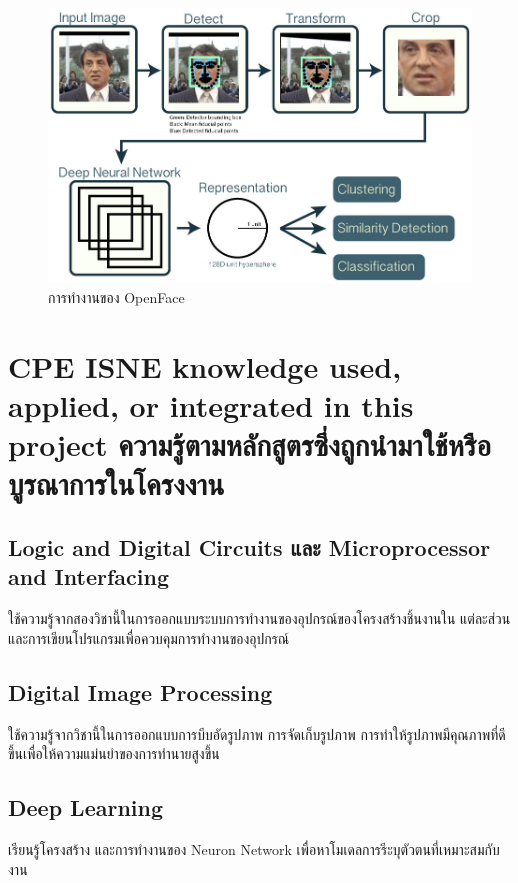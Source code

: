 \begin{figure}[!ht]
  \begin{center}
    \includegraphics[scale=.25]{pic/openface.jpg}
    \caption[การทำงานของ OpenFace]{การทำงานของ OpenFace}
    \label{fig:opemface}
  \end{center}
\end{figure}



\section{\ifenglish%
\ifcpe CPE \else ISNE \fi knowledge used, applied, or integrated in this project
\else%
ความรู้ตามหลักสูตรซึ่งถูกนำมาใช้หรือบูรณาการในโครงงาน
\fi
}

\subsection{Logic and Digital Circuits และ Microprocessor and Interfacing}

ใช้ความรู้จากสองวิชานี้ในการออกแบบระบบการทำงานของอุปกรณ์ของโครงสร้างชิ้นงานใน
แต่ละส่วน และการเขียนโปรแกรมเพื่อควบคุมการทำงานของอุปกรณ์

\subsection{Digital Image Processing}

ใช้ความรู้จากวิชานี้ในการออกแบบการบีบอัดรูปภาพ การจัดเก็บรูปภาพ การทำให้รูปภาพมีคุณภาพที่ดีขึ้นเพื่อให้ความแม่นยำของการทำนายสูงขึ้น

\subsection{Deep Learning}
เรียนรู้โครงสร้าง และการทำงานของ Neuron Network เพื่อหาโมเดลการรีะบุตัวตนที่เหมาะสมกับงาน

